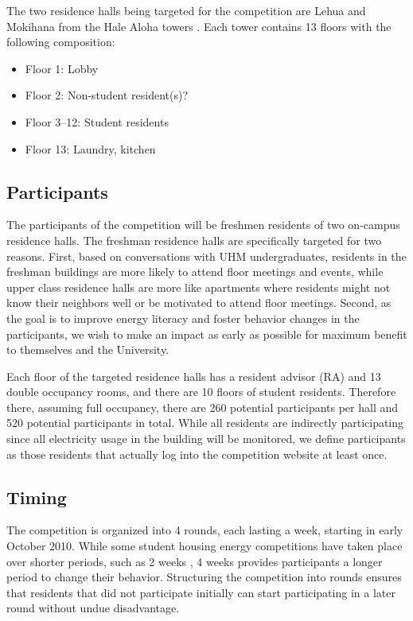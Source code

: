 The two residence halls being targeted for the competition are Lehua and Mokihana from the Hale Aloha towers \cite{hale-aloha-website}. Each tower contains 13 floors with the following composition:

\begin{itemize}
	\item Floor 1: Lobby
	\item Floor 2: Non-student resident(s)?
	\item Floor 3--12: Student residents
	\item Floor 13: Laundry, kitchen
\end{itemize}

\subsection{Participants}

The participants of the competition will be freshmen residents of two on-campus residence halls. The freshman residence halls are specifically targeted for two reasons. First, based on conversations with UHM undergraduates, residents in the freshman buildings are more likely to attend floor meetings and events, while upper class residence halls are more like apartments where residents might not know their neighbors well or be motivated to attend floor meetings. Second, as the goal is to improve energy literacy and foster behavior changes in the participants, we wish to make an impact as early as possible for maximum benefit to themselves and the University.

Each floor of the targeted residence halls has a resident advisor (RA) and 13 double occupancy rooms, and there are 10 floors of student residents. Therefore there, assuming full occupancy, there are 260 potential participants per hall and 520 potential participants in total. While all residents are indirectly participating since all electricity usage in the building will be monitored, we define participants as those residents that actually log into the competition website at least once.

\subsection{Timing}

The competition is organized into 4 rounds, each lasting a week, starting in early October 2010. While some student housing energy competitions have taken place over shorter periods, such as 2 weeks \cite{petersen-dorm-energy-reduction}, 4 weeks provides participants a longer period to change their behavior. Structuring the competition into rounds ensures that residents that did not participate initially can start participating in a later round without undue disadvantage.

